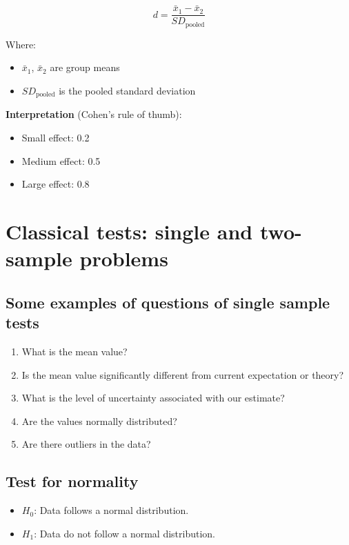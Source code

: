 \documentclass[
]{book}
\providecommand{\tightlist}{%
  \setlength{\itemsep}{0pt}\setlength{\parskip}{0pt}}
\begin{document}
\[d = \frac{\bar{x}_1 - \bar{x}_2}{SD_{\text{pooled}}}\]

Where:

\begin{itemize}
\tightlist
\item
  \(\bar{x}_1\), \(\bar{x}_2\) are group means
\item
  \(SD_{\text{pooled}}\) is the pooled standard deviation
\end{itemize}

\textbf{Interpretation} (Cohen's rule of thumb):

\begin{itemize}
\tightlist
\item
  Small effect: 0.2
\item
  Medium effect: 0.5
\item
  Large effect: 0.8
\end{itemize}

\section{Classical tests: single and two-sample problems}\label{classical-tests-single-and-two-sample-problems}

\subsection{Some examples of questions of single sample tests}\label{some-examples-of-questions-of-single-sample-tests}

\begin{enumerate}
\def\labelenumi{\arabic{enumi}.}
\tightlist
\item
  What is the mean value?
\item
  Is the mean value significantly different from current expectation or theory?
\item
  What is the level of uncertainty associated with our estimate?
\item
  Are the values normally distributed?
\item
  Are there outliers in the data?
\end{enumerate}

\subsection{Test for normality}\label{test-for-normality}

\begin{itemize}
\tightlist
\item
  \(H_0\): Data follows a normal distribution.
\item
  \(H_1\): Data do not follow a normal distribution.
\end{itemize}
\end{document}
